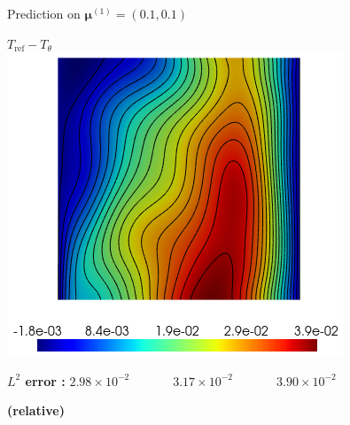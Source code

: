 \begin{frame}{Prediction on $\bm{\mu}^{(1)} = (0.1,0.1)$}
\begin{minipage}{0.26\linewidth}
    \end{minipage} \; \begin{minipage}{0.26\linewidth}
        \centering
        $T_\text{ref}-T_\theta$ \\
        \includegraphics[width=0.95\linewidth]{images/pinn/training/PINN_error_plot_case4_v2_param1_T.png}
    \end{minipage}

    \vspace{8pt}

    \textbf{$L^2$ error :} \hspace{25pt} $2.98\times10^{-2} \hspace{42pt} 3.17\times10^{-2} \hspace{42pt}  3.90\times10^{-2}$

    \vspace{-2pt}
    \textbf{\small (relative)}
\end{frame}